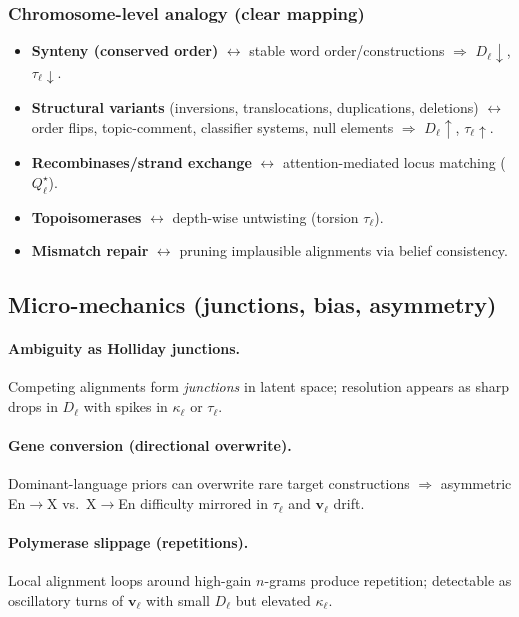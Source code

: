 \subsubsection*{Chromosome-level analogy (clear mapping)}
\begin{itemize}[leftmargin=1.2em]
  \item \textbf{Synteny (conserved order)} $\leftrightarrow$ stable word order/constructions $\Rightarrow$ $D_\ell\downarrow$, $\tau_\ell\downarrow$.
  \item \textbf{Structural variants} (inversions, translocations, duplications, deletions) $\leftrightarrow$ order flips, topic-comment, classifier systems, null elements $\Rightarrow$ $D_\ell\uparrow$, $\tau_\ell\uparrow$.
  \item \textbf{Recombinases/strand exchange} $\leftrightarrow$ attention-mediated locus matching ($Q_\ell^\star$).
  \item \textbf{Topoisomerases} $\leftrightarrow$ depth-wise untwisting (torsion $\tau_\ell$).
  \item \textbf{Mismatch repair} $\leftrightarrow$ pruning implausible alignments via belief consistency.
\end{itemize}

\subsection*{Micro-mechanics (junctions, bias, asymmetry)}
\paragraph{Ambiguity as Holliday junctions.} Competing alignments form \emph{junctions} in latent space; resolution appears as sharp drops in $D_\ell$ with spikes in $\kappa_\ell$ or $\tau_\ell$.
\paragraph{Gene conversion (directional overwrite).} Dominant-language priors can overwrite rare target constructions $\Rightarrow$ asymmetric En$\to$X vs.\ X$\to$En difficulty mirrored in $\tau_\ell$ and $\mathbf v_\ell$ drift.
\paragraph{Polymerase slippage (repetitions).} Local alignment loops around high-gain $n$-grams produce repetition; detectable as oscillatory turns of $\mathbf v_\ell$ with small $D_\ell$ but elevated $\kappa_\ell$.

